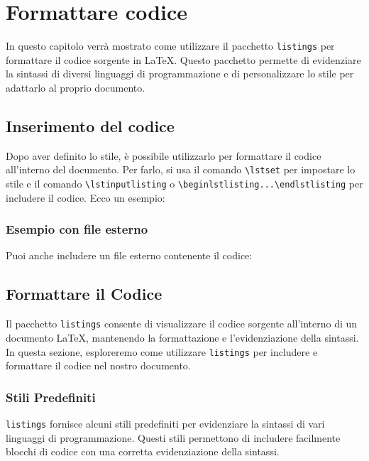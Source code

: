 \chapter{Formattare codice}

In questo capitolo verrà mostrato come utilizzare il pacchetto \texttt{listings} per formattare il codice sorgente in LaTeX. Questo pacchetto permette di evidenziare la sintassi di diversi linguaggi di programmazione e di personalizzare lo stile per adattarlo al proprio documento.

\section{Inserimento del codice}

Dopo aver definito lo stile, è possibile utilizzarlo per formattare il codice all'interno del documento. Per farlo, si usa il comando \texttt{\textbackslash lstset} per impostare lo stile e il comando \texttt{\textbackslash lstinputlisting} o \texttt{\textbackslash begin{lstlisting}...\textbackslash end{lstlisting}} per includere il codice. Ecco un esempio:

\subsection{Esempio con file esterno} Puoi anche includere un file esterno contenente il codice:



\section{Formattare il Codice}

Il pacchetto \texttt{listings} consente di visualizzare il codice sorgente all'interno di un documento LaTeX, mantenendo la formattazione e l'evidenziazione della sintassi. In questa sezione, esploreremo come utilizzare \texttt{listings} per includere e formattare il codice nel nostro documento.

\subsection{Stili Predefiniti}
\texttt{listings} fornisce alcuni stili predefiniti per evidenziare la sintassi di vari linguaggi di programmazione. Questi stili permettono di includere facilmente blocchi di codice con una corretta evidenziazione della sintassi.

